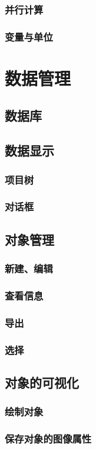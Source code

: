 \subsubsection{并行计算}
\subsubsection{变量与单位}
\section{数据管理}
\subsection{数据库}
\subsection{数据显示}
\subsubsection{项目树}
\subsubsection{对话框}
\subsection{对象管理}
\subsubsection{新建、编辑}
\subsubsection{查看信息}
\subsubsection{导出}
\subsubsection{选择}
\subsection{对象的可视化}
\subsubsection{绘制对象}
\subsubsection{保存对象的图像属性}
